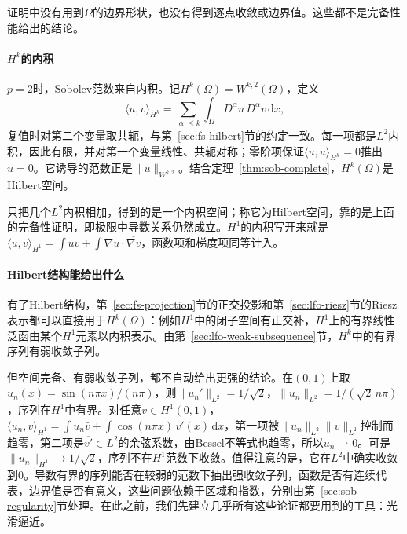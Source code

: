 证明中没有用到$\Omega$的边界形状，也没有得到逐点收敛或边界值。这些都不是完备性能给出的结论。

\paragraph{$H^k$的内积}
$p=2$时，Sobolev范数来自内积。记$H^k(\Omega)=W^{k,2}(\Omega)$，定义
\begin{equation}
 \langle u,v\rangle_{H^k}=\sum_{|\alpha|\le k}\int_\Omega D^\alpha u\,\overline{D^\alpha v}\,\mathrm dx ,
 \label{eq:sob-hk-inner-product}
\end{equation}
复值时对第二个变量取共轭，与第~\ref{sec:fs-hilbert}节的约定一致。每一项都是$L^2$内积，因此有限，并对第一个变量线性、共轭对称；零阶项保证$\langle u,u\rangle_{H^k}=0$推出$u=0$。它诱导的范数正是$\|u\|_{W^{k,2}}$。结合定理~\ref{thm:sob-complete}，$H^k(\Omega)$是Hilbert空间。

只把几个$L^2$内积相加，得到的是一个内积空间；称它为Hilbert空间，靠的是上面的完备性证明，即极限中导数关系仍然成立。$H^1$的内积写开来就是$\langle u,v\rangle_{H^1}=\int u\bar v+\int\nabla u\cdot\overline{\nabla v}$，函数项和梯度项同等计入。

\paragraph{Hilbert结构能给出什么}
有了Hilbert结构，第~\ref{sec:fs-projection}节的正交投影和第~\ref{sec:lfo-riesz}节的Riesz表示都可以直接用于$H^k(\Omega)$：例如$H^1$中的闭子空间有正交补，$H^1$上的有界线性泛函由某个$H^1$元素以内积表示。由第~\ref{sec:lfo-weak-subsequence}节，$H^k$中的有界序列有弱收敛子列。

但空间完备、有弱收敛子列，都不自动给出更强的结论。在$(0,1)$上取$u_n(x)=\sin(n\pi x)/(n\pi)$，则$\|u_n'\|_{L^2}=1/\sqrt2$，$\|u_n\|_{L^2}=1/(\sqrt2\,n\pi)$，序列在$H^1$中有界。对任意$v\in H^1(0,1)$，$\langle u_n,v\rangle_{H^1}=\int u_n\bar v+\int\cos(n\pi x)\,\overline{v'(x)}\,\mathrm dx$，第一项被$\|u_n\|_{L^2}\|v\|_{L^2}$控制而趋零，第二项是$\overline{v'}\in L^2$的余弦系数，由Bessel不等式也趋零，所以$u_n\rightharpoonup0$。可是$\|u_n\|_{H^1}\to1/\sqrt2$，序列不在$H^1$范数下收敛。值得注意的是，它在$L^2$中确实收敛到$0$。导数有界的序列能否在较弱的范数下抽出强收敛子列，函数是否有连续代表，边界值是否有意义，这些问题依赖于区域和指数，分别由第~\ref{sec:sob-regularity}节处理。在此之前，我们先建立几乎所有这些论证都要用到的工具：光滑逼近。
